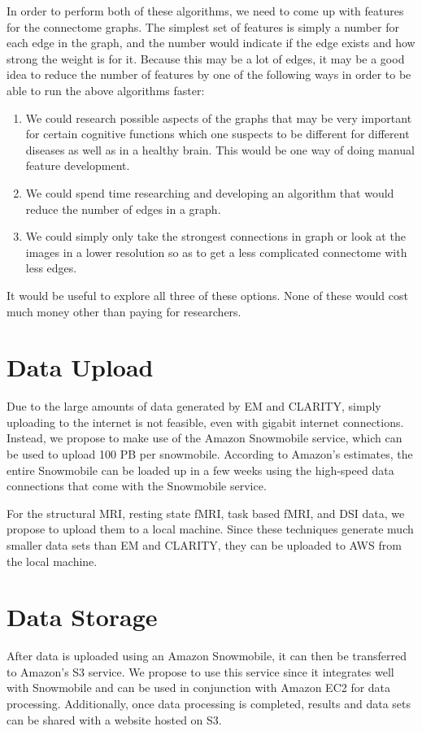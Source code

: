 \documentclass[12pt]{article}
\begin{document}
In order to perform both of these algorithms, we need to come up with features for the connectome graphs.  The simplest set of features is simply a number for each edge in the graph, and the number would indicate if the edge exists and how strong the weight is for it.  Because this may be a lot of edges, it may be a good idea to reduce the number of features by one of the following ways in order to be able to run the above algorithms faster: 
\begin{enumerate}
\item We could research possible aspects of the graphs that may be very important for certain cognitive functions which one suspects to be different for different diseases as well as in a healthy brain.  This would be one way of doing manual feature development. 
\item We could spend time researching and developing an algorithm that would reduce the number of edges in a graph. 
\item We could simply only take the strongest connections in graph or look at the images in a lower resolution so as to get a less complicated connectome with less edges.
\end{enumerate}
It would be useful to explore all three of these options.  None of these would cost much money other than paying for researchers.

\section{Data Upload}
Due to the large amounts of data generated by EM and CLARITY, simply uploading to the internet is not feasible, even with gigabit internet connections. Instead, we propose to make use of the Amazon Snowmobile service, which can be used to upload 100 PB per snowmobile. According to Amazon's estimates, the entire Snowmobile can be loaded up in a few weeks using the high-speed data connections that come with the Snowmobile service.

\indent For the structural MRI, resting state fMRI, task based fMRI, and DSI data, we propose to upload them to a local machine. Since these techniques generate much smaller data sets than EM and CLARITY, they can be uploaded to AWS from the local machine.


\section{Data Storage}
After data is uploaded using an Amazon Snowmobile, it can then be transferred to Amazon's S3 service. We propose to use this service since it integrates well with Snowmobile and can be used in conjunction with Amazon EC2 for data processing. Additionally, once data processing is completed, results and data sets can be shared with a website hosted on S3.
\end{document}
